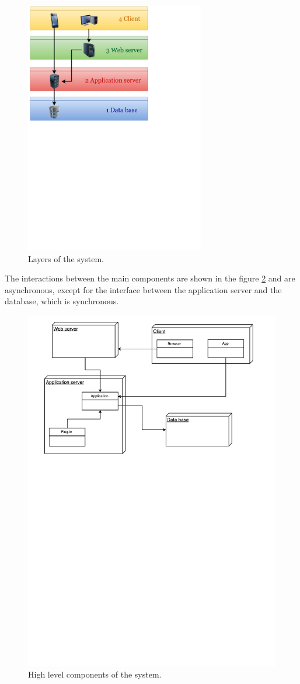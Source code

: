 \begin{figure}[h]
\centering
\includegraphics[width=0.7\textwidth]{diagrams/layers.pdf}
\caption{Layers of the system.}
\label{fig:layers}
\end{figure}

The interactions between the main components are shown in the figure \ref{fig:high_level_components} and are asynchronous, except for the interface between the application server and the database, which is synchronous.

\begin{figure}[h]
\centering
\includegraphics[width=\textwidth]{diagrams/high_level_components.pdf}
\caption{High level components of the system.}
\label{fig:high_level_components}
\end{figure}
